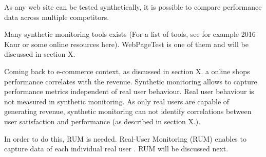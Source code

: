 As any web site can be tested synthetically, it is possible to compare performance data across multiple competitors. %



Many synthetic monitoring tools exists (For a list of tools, see for example 2016 Kaur or some online resources here).
WebPageTest is one of them and will be discussed in section X.




Coming back to e-commerce context, as discussed in section X.  a online shops performance correlates with the revenue.
Synthetic monitoring allows to capture performance metrics independent of real user behaviour.
Real user behaviour is not measured in synthetic monitoring.
As only real users are capable of generating revenue, synthetic monitoring can not identify correlations between user satisfaction and performance (as described in section X.).%

In order to do this, RUM is needed.
Real-User Monitoring (RUM) enables to capture data of each individual real user .
RUM will be discussed next.


















